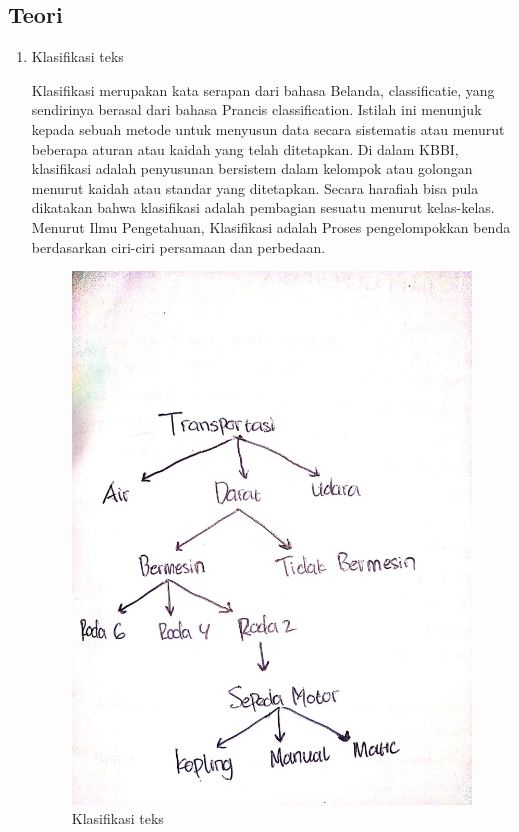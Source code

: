 \subsection{Teori}
\begin{enumerate}
\item Klasifikasi teks
	\par Klasifikasi merupakan kata serapan dari bahasa Belanda, classificatie, yang sendirinya berasal dari bahasa Prancis classification. Istilah ini menunjuk kepada sebuah metode untuk menyusun data secara sistematis atau menurut beberapa aturan atau kaidah yang telah ditetapkan.
	Di dalam KBBI, klasifikasi adalah penyusunan bersistem dalam kelompok atau golongan menurut kaidah atau standar yang ditetapkan. Secara harafiah bisa pula dikatakan bahwa klasifikasi adalah pembagian sesuatu menurut kelas-kelas. Menurut Ilmu Pengetahuan, Klasifikasi adalah Proses pengelompokkan benda berdasarkan ciri-ciri persamaan dan perbedaan.
	\begin{figure}[ht]
		\centering
		\includegraphics[scale=0.5]{figures/andi/4-1.jpeg}
		\caption{Klasifikasi teks}
		\label{Contoh Ilustrasi}
	\end{figure}
	

\end{enumerate}
